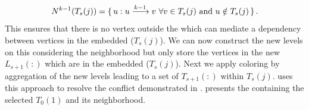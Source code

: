 \begin{equation*}
	   N^{k-1}(T_s(j)) = \set{u : u \xrightarrow{k-1} v \text{  } \forall v \in T_s(j) \text { and } u \notin T_s(j)}.
\end{equation*}
This ensures that there is no vertex outside the \subgraph which can mediate a \DK dependency between vertices in the embedded \levelGroup ($T_s(j)$). We can now construct the new levels on this \subgraph considering the neighborhood but only store the vertices in the new \levels $L_{s+1}(:)$ which are in the embedded \levelGroup ($T_s(j)$). Next we apply \DK coloring by aggregation of the new levels leading to a set of \levelGroups $T_{s+1}(:)$ within $T_s(j)$.  uses this approach to resolve the conflict demonstrated in .  presents the \subgraph containing the selected \levelGroup $T_0(1)$ and its \DONE neighborhood. %
